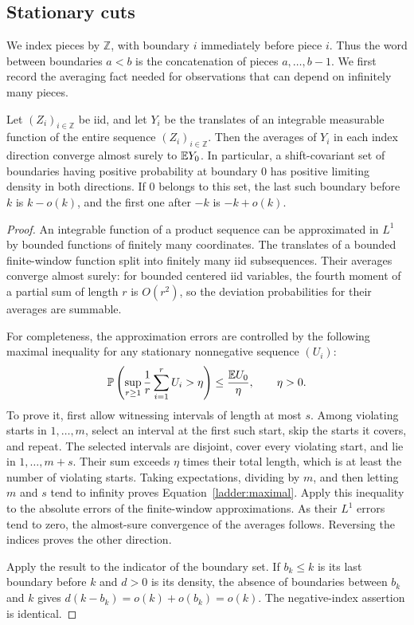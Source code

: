 \subsection{Stationary cuts}

We index pieces by $\mathbb Z$, with boundary $i$ immediately before piece $i$.
Thus the word between boundaries $a<b$ is the concatenation of pieces
$a,\ldots,b-1$.
We first record the averaging fact needed for observations that can depend
on infinitely many pieces.

\begin{lemma}
\label{ladder:averaging}
Let $(Z_i)_{i\in\mathbb Z}$ be iid, and let $Y_i$ be the translates of an
integrable measurable function of the entire sequence $(Z_i)_{i\in\mathbb Z}$.
Then the averages of $Y_i$ in each index direction converge almost surely
to $\mathbb E Y_0$.
In particular, a shift-covariant set of boundaries having positive
probability at boundary $0$ has positive limiting density in both
directions. If $0$ belongs to this set, the last such boundary before $k$
is $k-o(k)$, and the first one after $-k$ is $-k+o(k)$.
\end{lemma}

\begin{proof}
An integrable function of a product sequence can be approximated in $L^1$
by bounded functions of finitely many coordinates.
The translates of a bounded finite-window function split into finitely
many iid subsequences. Their averages converge almost surely: for bounded
centered iid variables, the fourth moment of a partial sum of length $r$
is $O(r^2)$, so the deviation probabilities for their averages are summable.

For completeness, the approximation errors are controlled by the following
maximal inequality for any stationary nonnegative sequence $(U_i)$:
\begin{equation}
 \mathbb P\left(\sup_{r\ge1}\frac1r\sum_{i=1}^r U_i>\eta\right)
 \le \frac{\mathbb E U_0}{\eta},\qquad \eta>0.
 \label{ladder:maximal}
\end{equation}
To prove it, first allow witnessing intervals of length at most $s$.
Among violating starts in $1,\ldots,m$, select an interval at the first
such start, skip the starts it covers, and repeat.
The selected intervals are disjoint, cover every violating start, and lie
in $1,\ldots,m+s$.
Their sum exceeds $\eta$ times their total length, which is at least the
number of violating starts.
Taking expectations, dividing by $m$, and then letting $m$ and $s$ tend to
infinity proves Equation~\eqref{ladder:maximal}.
Apply this inequality to the absolute errors of the finite-window
approximations. As their $L^1$ errors tend to zero, the almost-sure
convergence of the averages follows. Reversing the indices proves the
other direction.

Apply the result to the indicator of the boundary set.
If $b_k\le k$ is its last boundary before $k$ and $d>0$ is its density,
the absence of boundaries between $b_k$ and $k$ gives
$d(k-b_k)=o(k)+o(b_k)=o(k)$.
The negative-index assertion is identical.
\end{proof}


